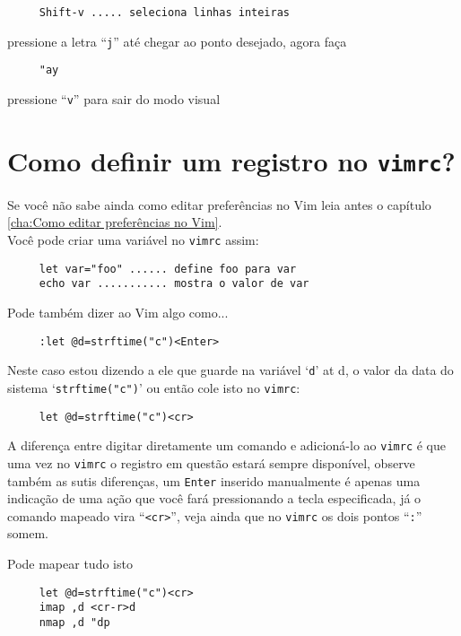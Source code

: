 \begin{verbatim}
     Shift-v ..... seleciona linhas inteiras
\end{verbatim}

pressione a letra ``\verb|j|'' até chegar ao ponto desejado, agora faça

\begin{verbatim}
     "ay
\end{verbatim}

pressione ``\verb|v|'' para sair do modo visual

\section{Como definir um registro no {\tt vimrc}?}
\label{Como definir um registro no vimrc?}

Se você não sabe ainda como editar preferências no Vim
leia antes o capítulo \ref{cha:Como editar preferências no Vim}. \\


Você pode criar uma variável no {\tt vimrc} assim:

\begin{verbatim}
     let var="foo" ...... define foo para var
     echo var ........... mostra o valor de var
\end{verbatim}

Pode também dizer ao Vim algo como...

\begin{verbatim}
     :let @d=strftime("c")<Enter>
\end{verbatim}

Neste caso estou dizendo a ele que guarde na variável `{\tt d}' at d,
o valor da data do sistema `{\tt strftime("c")}' ou então cole isto no
{\tt vimrc}:

\begin{verbatim}
     let @d=strftime("c")<cr>
\end{verbatim}

A diferença entre digitar diretamente um comando e adicioná-lo ao
{\tt vimrc} é que uma vez no {\tt vimrc} o registro em questão estará sempre
disponível, observe também as sutis diferenças, um {\tt Enter} inserido
manualmente é apenas uma indicação de uma ação que você fará
pressionando a tecla especificada, já o comando mapeado vira
``\verb|<cr>|'', veja ainda que no {\tt vimrc} os dois pontos ``\verb|:|''
somem.

Pode mapear tudo isto

\begin{verbatim}
     let @d=strftime("c")<cr>
     imap ,d <cr-r>d
     nmap ,d "dp
\end{verbatim}


